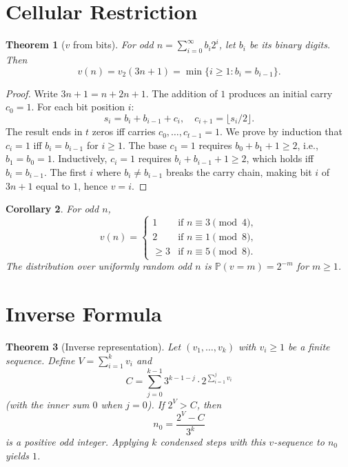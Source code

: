 \documentclass[12pt,a4paper]{article}
\newtheorem{theorem}{Theorem}[section]
\newtheorem{corollary}[theorem]{Corollary}
\newcommand{\Prob}{\mathbb{P}}
\begin{document}
\section{Cellular Restriction}\label{sec:cellular}

\begin{theorem}[$v$ from bits]\label{thm:cellular}
For odd $n = \sum_{i=0}^\infty b_i 2^i$, let $b_i$ be its binary digits. Then
\[
v(n) = v_2(3n+1) = \min\{ i \ge 1 : b_i = b_{i-1} \}.
\]
\end{theorem}

\begin{proof}
Write $3n+1 = n + 2n + 1$. The addition of $1$ produces an initial carry $c_0 = 1$. For each bit position $i$:
\[
s_i = b_i + b_{i-1} + c_i, \quad c_{i+1} = \lfloor s_i/2 \rfloor.
\]
The result ends in $t$ zeros iff carries $c_0,\ldots,c_{t-1} = 1$. We prove by induction that $c_i = 1$ iff $b_i = b_{i-1}$ for $i \ge 1$. The base $c_1 = 1$ requires $b_0 + b_1 + 1 \ge 2$, i.e., $b_1 = b_0 = 1$. Inductively, $c_i = 1$ requires $b_i + b_{i-1} + 1 \ge 2$, which holds iff $b_i = b_{i-1}$. The first $i$ where $b_i \neq b_{i-1}$ breaks the carry chain, making bit $i$ of $3n+1$ equal to $1$, hence $v = i$.
\end{proof}

\begin{corollary}\label{cor:residue}
For odd $n$,
\[
v(n) = \begin{cases}
1 & \text{if } n \equiv 3 \pmod 4,\\
2 & \text{if } n \equiv 1 \pmod 8,\\
\ge 3 & \text{if } n \equiv 5 \pmod 8.
\end{cases}
\]
The distribution over uniformly random odd $n$ is $\Prob(v = m) = 2^{-m}$ for $m \ge 1$.
\end{corollary}

\section{Inverse Formula}\label{sec:inverse}

\begin{theorem}[Inverse representation]\label{thm:inverse}
Let $(v_1,\ldots,v_k)$ with $v_i \ge 1$ be a finite sequence. Define $V = \sum_{i=1}^k v_i$ and
\[
C = \sum_{j=0}^{k-1} 3^{k-1-j} \cdot 2^{\sum_{i=1}^j v_i}
\]
(with the inner sum $0$ when $j=0$). If $2^V > C$, then
\[
n_0 = \frac{2^V - C}{3^k}
\]
is a positive odd integer. Applying $k$ condensed steps with this $v$-sequence to $n_0$ yields $1$.
\end{theorem}
\end{document}
